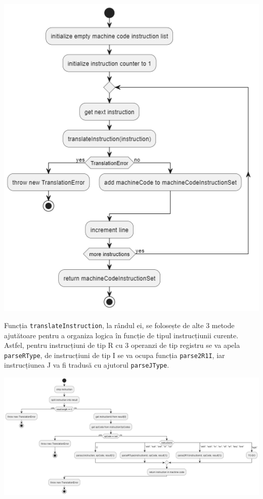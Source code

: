 \documentclass{article}
\begin{document}
\begin{tcolorbox}[colback=white!5!white,colframe=violet!75!black,title=Diagramă de clasa - Translator]
\includegraphics[width=\textwidth]{img/activityTranslateInstructionSet.png}
\end{tcolorbox}

Funcția \texttt{translateInstruction}, la rândul ei, se folosește de alte 3 metode ajutătoare pentru a organiza logica în funcție de tipul instrucțiunii curente. Astfel, pentru instrucțiuni de tip R cu 3 operanzi de tip registru se va apela \texttt{parseRType}, de instrucțiuni de tip I se va ocupa funcția \texttt{parse2R1I}, iar instrucțiunea J va fi tradusă cu ajutorul \texttt{parseJType}.

\begin{tcolorbox}[colback=white!5!white,colframe=violet!75!black,title=Diagramă de clasa - Translator]
\includegraphics[width=\textwidth]{img/activityParseInstruction.png}
\end{tcolorbox}
\end{document}
